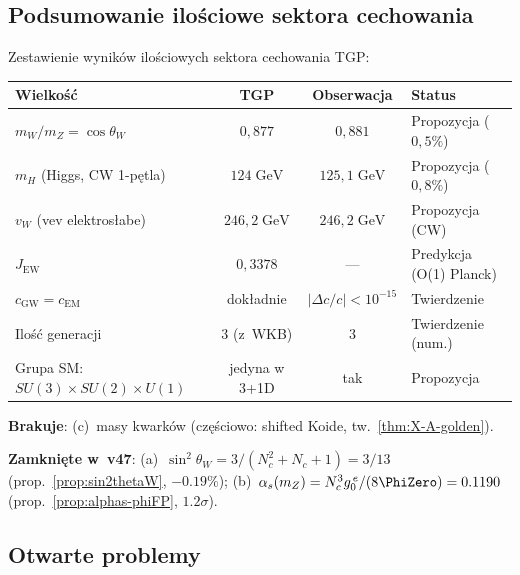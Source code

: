 \subsection{Podsumowanie ilo\'sciowe sektora cechowania}%
\label{ssec:gauge-summary}

\begin{remark}%
\label{rem:gauge-quantitative}
Zestawienie wynik\'ow ilo\'sciowych sektora cechowania TGP:
\begin{center}\small
\begin{tabular}{@{}lccl@{}}
\toprule
\textbf{Wielko\'s\'c} & \textbf{TGP} & \textbf{Obserwacja}
  & \textbf{Status} \\
\midrule
$m_W / m_Z = \cos\theta_W$
  & $0{,}877$ & $0{,}881$ & Propozycja ($0{,}5\%$) \\
$m_H$ (Higgs, CW 1-p\k{e}tla)
  & $124\;\mathrm{GeV}$ & $125{,}1\;\mathrm{GeV}$ & Propozycja ($0{,}8\%$) \\
$v_W$ (vev elektros\l{}abe)
  & $246{,}2\;\mathrm{GeV}$ & $246{,}2\;\mathrm{GeV}$ & Propozycja (CW) \\
$J_{\mathrm{EW}}$
  & $0{,}3378$ & --- & Predykcja (O(1) Planck) \\
$c_{\mathrm{GW}} = c_{\mathrm{EM}}$
  & dok\l{}adnie & $|\Delta c/c| < 10^{-15}$ & Twierdzenie \\
Ilo\'s\'c generacji
  & $3$ (z~WKB) & $3$ & Twierdzenie (num.) \\
Grupa SM: $SU(3){\times}SU(2){\times}U(1)$
  & jedyna w 3+1D & tak & Propozycja \\
\bottomrule
\end{tabular}
\end{center}
\noindent
\textbf{Brakuje}:
(c)~masy kwark\'ow (cz\k{e}\'sciowo: shifted Koide,
tw.~\ref{thm:X-A-golden}).

\smallskip\noindent
\textbf{Zamkni\k{e}te w~v47}:
(a)~$\sin^2\theta_W = 3/(N_c^2{+}N_c{+}1) = 3/13$
(prop.~\ref{prop:sin2thetaW}, $-0.19\%$);
(b)~$\alpha_s(m_Z) = N_c^3 g_0^{\,e}/(8\PhiZero) = 0.1190$
(prop.~\ref{prop:alphas-phiFP}, $1.2\sigma$).
\end{remark}

\subsection{Otwarte problemy}\label{ssec:cechowanie-problemy}

